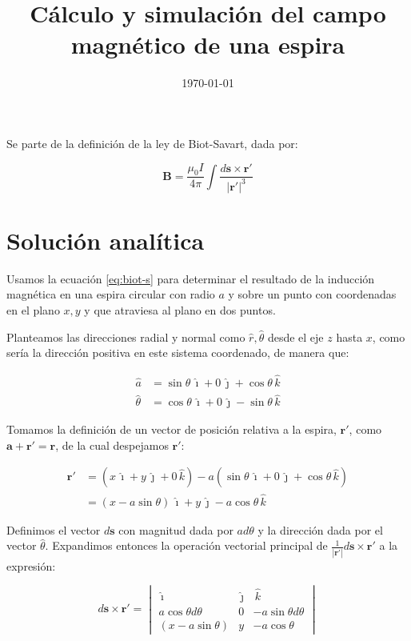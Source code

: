 \documentclass{article}
\title{Cálculo y simulación del campo magnético de una espira}
\author{}
\date{\today}
\def\ii{\, \hat{\imath}  }
\def\jj{\, \hat{\jmath}  }
\def\kk{\, \hat{k}}
\newcommand\cross[6]{
\begin{vmatrix}
	\ii & \jj & \kk \\
	#1 & #2 & #3 \\
	#4 & #5 & #6
\end{vmatrix}
}
\begin{document}
\maketitle

Se parte de la definición de la ley de Biot-Savart, dada por:

\begin{equation} \label{eq:biot-s}
	\mathbf{B} = \frac{\mu_0 I}{4 \pi} \int \frac{ d \mathbf{s} \times \mathbf{r}' }{ | \mathbf{r}' |^3 }
\end{equation}

\section{Solución analítica}
\noindent
Usamos la ecuación \ref{eq:biot-s} para determinar el resultado de la inducción magnética en una espira circular
con radio \(a\) y sobre un punto con coordenadas en el plano \(x,y\) y que atraviesa al plano en dos puntos.

Planteamos las direcciones radial y normal como \( \hat{r}, \hat{\theta} \) desde el eje \(z\) hasta \(x\), como
sería la dirección positiva en este sistema coordenado, de manera que:

\begin{align}
	\hat{a}      & = \sin \theta \ii + 0 \jj + \cos \theta \kk \\
	\hat{\theta} & = \cos \theta \ii + 0 \jj - \sin \theta \kk
\end{align}

Tomamos la definición de un vector de posición relativa a la espira, \(\mathbf{r}'\), como
\(\mathbf{a} + \mathbf{r}' = \mathbf{r} \), de la cual despejamos \(\mathbf{r}'\):

\[
	\begin{aligned}
		\mathbf{r}' & = ( x \ii + y \jj + 0 \kk) - a ( \sin \theta \ii + 0 \jj + \cos \theta \kk ) \\
		            & = (x - a \sin \theta) \ii + y \jj - a \cos \theta \kk
	\end{aligned}
\]

Definimos el vector \(d \mathbf{s}\) con magnitud dada por \(a d \theta\) y la dirección dada por
el vector \(\hat{\theta}\). Expandimos entonces la operación vectorial principal de
\( \frac{1}{| \mathbf{r}' |} d \mathbf{s} \times \mathbf{r'} \) a la expresión:

\begin{equation}
	d \mathbf{s} \times \mathbf{r}' = \cross{a \cos \theta d \theta}{0}{-a \sin \theta d \theta}{(x-a\sin \theta)}{y}{-a \cos \theta}
\end{equation}
\end{document}
